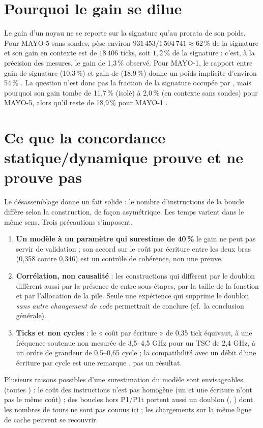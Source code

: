 \section{Pourquoi le gain se dilue}
Le gain d'un noyau ne se reporte sur la signature qu'au prorata de son poids. Pour MAYO-5 sans sondes,  pèse environ $931\,453/1\,504\,741\approx62$\,\% de la signature et son gain en contexte est de $18\,406$ ticks, soit $1{,}2$\,\% de la signature : c'est, à la précision des mesures, le gain de 1,3\,\% observé. Pour MAYO-1, le rapport entre gain de signature (10,3\,\%) et gain de  (18,9\,\%) donne un poids implicite d'environ 54\,\% \I{}. La question n'est donc pas la fraction de la signature occupée par , mais pourquoi son gain tombe de 11,7\,\% (isolé) à 2,0\,\% (en contexte sans sondes) pour MAYO-5, alors qu'il reste de 18,9\,\% pour MAYO-1 \F{}.

\section{Ce que la concordance statique/dynamique prouve et ne prouve pas}
Le désassemblage donne un fait solide : le nombre d'instructions de la boucle diffère selon la construction, de façon asymétrique. Les temps varient dans le même sens. Trois précautions s'imposent.
\begin{enumerate}
\item \textbf{Un modèle à un paramètre qui surestime de 40\,\%} le gain ne peut pas servir de validation ; son accord sur le coût par écriture entre les deux bras (0,358 contre 0,346) est un contrôle de cohérence, non une preuve.
\item \textbf{Corrélation, non causalité} : les constructions qui diffèrent par le doublon diffèrent aussi par la présence de  entre sous-étapes, par la taille de la fonction et par l'allocation de la pile. Seule une expérience qui supprime le doublon \emph{sans autre changement de code} permettrait de conclure (cf.\ la conclusion générale).
\item \textbf{Ticks et non cycles} : le « coût par écriture » de 0,35 tick équivaut, à une fréquence soutenue non mesurée de 3,5--4,5 GHz pour un TSC de 2,4 GHz, à un ordre de grandeur de 0,5--0,65 cycle ; la compatibilité avec un débit d'une écriture par cycle est une remarque \Hy{}, pas un résultat.
\end{enumerate}
Plusieurs raisons possibles d'une surestimation du modèle sont envisageables (toutes \Hy{}) : le coût des instructions n'est pas homogène (un  et une écriture n'ont pas le même coût) ; des boucles hors P1/P1t portent aussi un doublon (, ) dont les nombres de tours ne sont pas connus ici ; les chargements sur la même ligne de cache peuvent se recouvrir.

